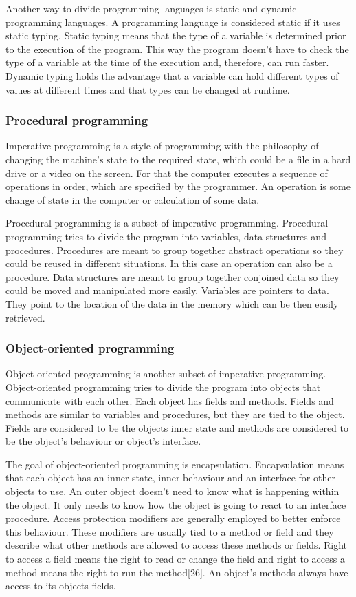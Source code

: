 Another way to divide programming languages is static and dynamic programming languages. A programming language is considered static if it uses static typing. Static typing means that the type of a variable is determined prior to the execution of the program. This way the program doesn't have to check the type of a variable at the time of the execution and, therefore, can run faster. Dynamic typing holds the advantage that a variable can hold different types of values at different times and that types can be changed at runtime.

\subsubsection{Procedural programming}
Imperative programming is a style of programming with the philosophy of changing the machine's state to the required state, which could be a file in a hard drive or a video on the screen. For that the computer executes a sequence of operations in order, which are specified by the programmer. An operation is some change of state in the computer or calculation of some data.

Procedural programming is a subset of imperative programming. Procedural programming tries to divide the program into variables, data structures and procedures. Procedures are meant to group together abstract operations so they could be reused in different situations. In this case an operation can also be a procedure. Data structures are meant to group together conjoined data so they could be moved and manipulated more easily. Variables are pointers to data. They point to the location of the data in the memory which can be then easily retrieved.

\subsubsection{Object-oriented programming}
Object-oriented programming is another subset of imperative programming. Object-oriented programming tries to divide the program into objects that communicate with each other. Each object has fields and methods. Fields and methods are similar to variables and procedures, but they are tied to the object. Fields are considered to be the objects inner state and methods are considered to be the object's behaviour or object's interface.

The goal of object-oriented programming is encapsulation. Encapsulation means that each object has an inner state, inner behaviour and an interface for other objects to use. An outer object doesn't need to know what is happening within the object. It only needs to know how the object is going to react to an interface procedure. Access protection modifiers are generally employed to better enforce this behaviour. These modifiers are usually tied to a method or field and they describe what other methods are allowed to access these methods or fields. Right to access a field means the right to read or change the field and right to access a method means the right to run the method[26]. An object's methods always have access to its objects fields.

